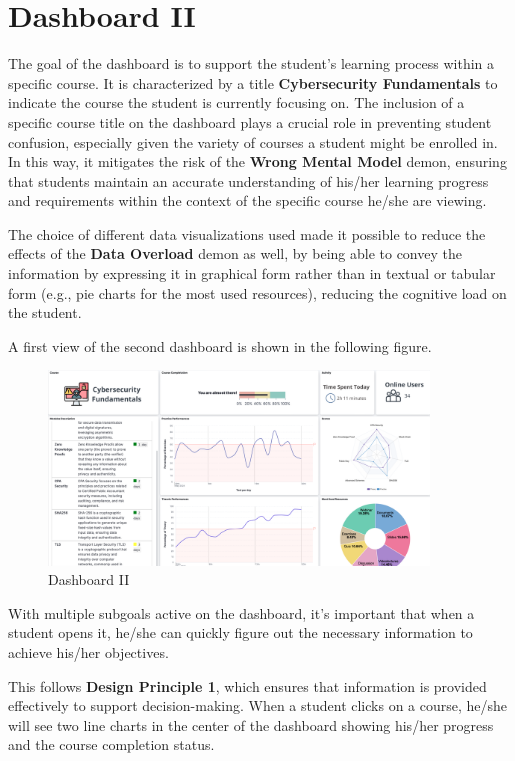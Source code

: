 \section{Dashboard II}

The goal of the dashboard is to support the student's learning process within a specific course. It is characterized by a title \textbf{Cybersecurity Fundamentals} to indicate the course the student is currently focusing on. The inclusion of a specific course title on the dashboard plays a crucial role in preventing student confusion, especially given the variety of courses a student might be enrolled in. 
In this way, it mitigates the risk of the \textbf{Wrong Mental Model} demon, ensuring that students maintain an accurate understanding of his/her learning progress and requirements within the context of the specific course he/she are viewing. 

The choice of different data visualizations used made it possible to reduce the effects of the \textbf{Data Overload} demon as well, by being able to convey the information by expressing it in graphical form rather than in textual or tabular form (e.g., pie charts for the most used resources), reducing the cognitive load on the student. 

A first view of the second dashboard is shown in the following figure.

\begin{figure}[H]
    \centering
    \includegraphics[width=0.9\textwidth]{assets/dashboard_2.png}
    \caption{Dashboard II}
    \label{fig:dashboard_2}
\end{figure}

With multiple subgoals active on the dashboard, it’s important that when a student opens it, he/she can quickly figure out the necessary information to achieve his/her objectives. 

This follows \textbf{Design Principle 1}, which ensures that information is provided effectively to support decision-making. When a student clicks on a course, he/she will see two line charts in the center of the dashboard showing his/her progress and the course completion status.

